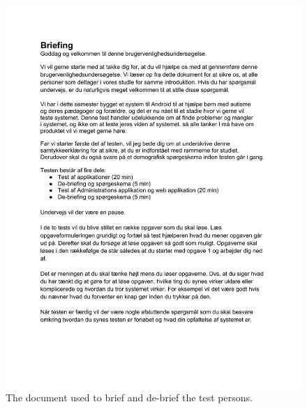 \begin{figure}%
	\begin{center}
	\includegraphics[width=\textwidth]{Appendix/Briefingogde-briefing}
	\end{center}
\caption{The document used to brief and de-brief the test persons.}
\label{fig:brief_debrief}
\end{figure}



